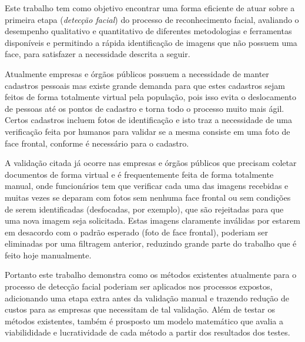 Este trabalho tem como objetivo encontrar uma forma eficiente de atuar sobre a primeira etapa (\textit{detecção facial}) do processo de reconhecimento facial, avaliando o desempenho qualitativo e quantitativo de diferentes metodologias e ferramentas disponíveis e permitindo a rápida identificação de imagens que não possuem uma face, para satisfazer a necessidade descrita a seguir.

Atualmente empresas e órgãos públicos possuem a necessidade de manter cadastros pessoais mas existe grande demanda para que estes cadastros sejam feitos de forma totalmente virtual pela população, pois isso evita o deslocamento de pessoas até os pontos de cadastro e torna todo o processo muito mais ágil. Certos cadastros incluem fotos de identificação e isto traz a necessidade de uma verificação feita por humanos para validar se a mesma consiste em uma foto de face frontal, conforme é necessário para o cadastro.

A validação citada já ocorre nas empresas e órgãos públicos que precisam coletar documentos de forma virtual e é frequentemente feita de forma totalmente manual, onde funcionários tem que verificar cada uma das imagens recebidas e muitas vezes se deparam com fotos sem nenhuma face frontal ou sem condições de serem identificadas (desfocadas, por exemplo), que são rejeitadas para que uma nova imagem seja solicitada. Estas imagens claramente inválidas por estarem em desacordo com o padrão esperado (foto de face frontal), poderiam ser eliminadas por uma filtragem anterior, reduzindo grande parte do trabalho que é feito hoje manualmente.

Portanto este trabalho demonstra como os métodos existentes atualmente para o processo de detecção facial poderiam ser aplicados nos processos expostos, adicionando uma etapa extra antes da validação manual e trazendo redução de custos para as empresas que necessitam de tal validação. Além de testar os métodos existentes, também é prosposto um modelo matemático que avalia a viabilididade e lucratividade de cada método a partir dos resultados dos testes.
